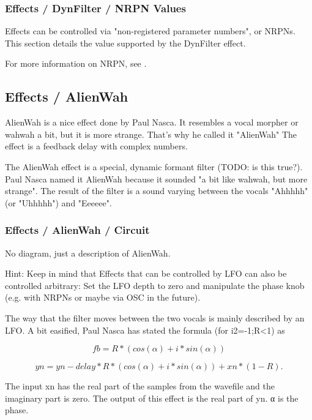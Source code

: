 \subsubsection{Effects / DynFilter / NRPN Values}
\label{subsubsec:effects_edit_dynfilter_nrpn}

   Effects can be controlled via "non-registered parameter numbers", or NRPNs.
   This section details the value supported by the DynFilter effect.

   For more information on NRPN, see
   .


\subsection{Effects / AlienWah}
\label{subsec:effects_edit_alienwah}

   AlienWah is a nice effect done by Paul Nasca. It resembles a vocal morpher
   or wahwah a bit, but it is more strange. That's why he called it "AlienWah"
   The effect is a feedback delay with complex numbers. 

   The AlienWah effect is a special, dynamic formant filter (TODO: is this
   true?). Paul Nasca named it AlienWah because it sounded "a bit like
   wahwah, but more strange". The result of the filter is a sound varying
   between the vocals "Ahhhhh" (or "Uhhhhh") and "Eeeeee".

\subsubsection{Effects / AlienWah / Circuit}
\label{subsubsec:effects_edit_alienwah_circuit}

   No diagram, just a description of AlienWah.

   Hint: Keep in mind that Effects that can be controlled by LFO can also be
   controlled arbitrary: Set the LFO depth to zero and manipulate the phase
   knob (e.g. with NRPNs or maybe via OSC in the future).

   The way that the filter moves between the two vocals is mainly described
   by an LFO. A bit easified, Paul Nasca has stated the formula (for
         i2=-1;R<1) as

   \[fb=R*(cos(α)+i*sin(α))\]

   \[yn=yn-delay*R*(cos(α)+i*sin(α))+xn*(1-R).\]

   The input xn has the real part of the samples from the wavefile and the
   imaginary part is zero. The output of this effect is the real part of yn.
   α is the phase.

